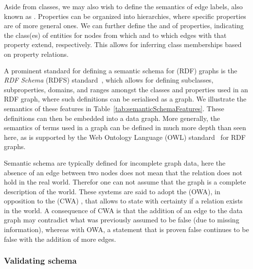 Aside from classes, we may also wish to define the semantics of edge labels, also known as . Properties can be organized into hierarchies, where specific properties are  of more general ones. We can further define the  and  of properties, indicating the class(es) of entities for nodes from which and to which edges with that property extend, respectively. This allows for inferring class memberships based on property relations.

A prominent standard for defining a semantic schema for (RDF) graphs is the \textit{RDF Schema} (RDFS) standard~\cite{Brickley2014RDFSchema1.1}, which allows for defining subclasses, subproperties, domains, and ranges amongst the classes and properties used in an RDF graph, where such definitions can be serialised as a graph. We illustrate the semantics of these features in Table~\ref{tab:semanticSchemaFeatures}. These definitions can then be embedded into a data graph. More generally, the semantics of terms used in a graph can be defined in much more depth than seen here, as is supported by the Web Ontology Language (OWL) standard~\cite{Hitzler2014OWLPrimer} for RDF graphs.

Semantic schema are typically defined for incomplete graph data, here the absence of an edge between two nodes does not mean that the relation does not hold in the real world. Therefor one can not assume that the graph is a complete description of the world. These systems are said to adopt the  (OWA), in opposition to the  (CWA) , that allows to state with certainty if a relation exists in the world. A consequence of CWA is that the addition of an edge to the data graph may contradict what was previously assumed to be false (due to missing information), whereas with OWA, a statement that is proven false continues to be false with the addition of more edges.

\subsubsection{Validating schema}






